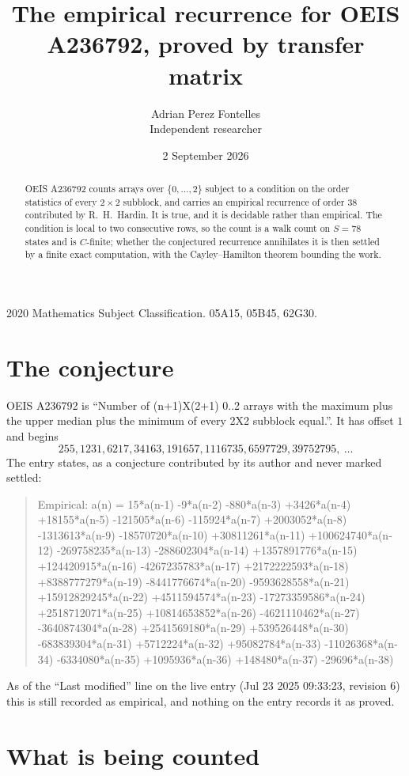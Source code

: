 \documentclass[11pt,a4paper]{article}
\title{The empirical recurrence for OEIS A236792, proved by transfer matrix}
\author{Adrian Perez Fontelles\\ \small Independent researcher}
\date{2 September 2026}
\theoremstyle{plain}
\theoremstyle{definition}
\begin{document}
\maketitle

\begin{abstract}
OEIS A236792 counts arrays over $\{0,\dots,2\}$ subject to a condition on the order
statistics of every $2\times2$ subblock, and carries an empirical recurrence of order
$38$ contributed by R.~H.~Hardin. It is true, and it is decidable rather than empirical.
The condition is local to two consecutive rows, so the count is a walk count on $S=78$
states and is $C$-finite; whether the conjectured recurrence annihilates it is then settled by
a finite exact computation, with the Cayley--Hamilton theorem bounding the work.
\end{abstract}

\noindent\small 2020 Mathematics Subject Classification. 05A15, 05B45, 62G30.\normalsize

\section{The conjecture}

OEIS A236792 is ``Number of (n+1)X(2+1) 0..2 arrays with the maximum plus the upper median plus the minimum of every 2X2 subblock equal.''. It has offset $1$ and begins
\[
255, 1231, 6217, 34163, 191657, 1116735, 6597729, 39752795,\ \dots
\]
The entry states, as a conjecture contributed by its author and never marked settled:
\begin{quote}
Empirical: a(n) = 15*a(n-1) -9*a(n-2) -880*a(n-3) +3426*a(n-4) +18155*a(n-5) -121505*a(n-6) -115924*a(n-7) +2003052*a(n-8) -1313613*a(n-9) -18570720*a(n-10) +30811261*a(n-11) +100624740*a(n-12) -269758235*a(n-13) -288602304*a(n-14) +1357891776*a(n-15) +124420915*a(n-16) -4267235783*a(n-17) +2172222593*a(n-18) +8388777279*a(n-19) -8441776674*a(n-20) -9593628558*a(n-21) +15912829245*a(n-22) +4511594574*a(n-23) -17273359586*a(n-24) +2518712071*a(n-25) +10814653852*a(n-26) -4621110462*a(n-27) -3640874304*a(n-28) +2541569180*a(n-29) +539526448*a(n-30) -683839304*a(n-31) +5712224*a(n-32) +95082784*a(n-33) -11026368*a(n-34) -6334080*a(n-35) +1095936*a(n-36) +148480*a(n-37) -29696*a(n-38)
\end{quote}
As of the ``Last modified'' line on the live entry (Jul 23 2025 09:33:23, revision 6) this is still
recorded as empirical, and nothing on the entry records it as proved.

\section{What is being counted}
\end{document}
